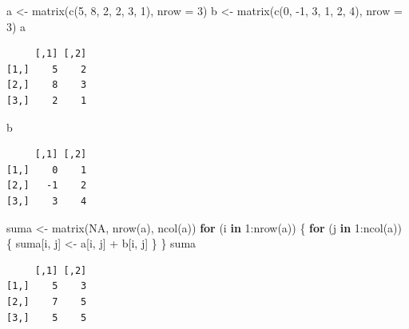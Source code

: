 \documentclass[
]{book}
\newenvironment{Shaded}{\begin{snugshade}}{\end{snugshade}}
\newcommand{\AttributeTok}[1]{\textcolor[rgb]{0.77,0.63,0.00}{#1}}
\newcommand{\ConstantTok}[1]{\textcolor[rgb]{0.00,0.00,0.00}{#1}}
\newcommand{\ControlFlowTok}[1]{\textcolor[rgb]{0.13,0.29,0.53}{\textbf{#1}}}
\newcommand{\DecValTok}[1]{\textcolor[rgb]{0.00,0.00,0.81}{#1}}
\newcommand{\FunctionTok}[1]{\textcolor[rgb]{0.00,0.00,0.00}{#1}}
\newcommand{\NormalTok}[1]{#1}
\newcommand{\OtherTok}[1]{\textcolor[rgb]{0.56,0.35,0.01}{#1}}
\newcommand{\SpecialCharTok}[1]{\textcolor[rgb]{0.00,0.00,0.00}{#1}}
\begin{document}
\begin{Shaded}
\begin{Highlighting}[]
\NormalTok{a }\OtherTok{\textless{}{-}} \FunctionTok{matrix}\NormalTok{(}\FunctionTok{c}\NormalTok{(}\DecValTok{5}\NormalTok{, }\DecValTok{8}\NormalTok{, }\DecValTok{2}\NormalTok{, }\DecValTok{2}\NormalTok{, }\DecValTok{3}\NormalTok{, }\DecValTok{1}\NormalTok{), }\AttributeTok{nrow =} \DecValTok{3}\NormalTok{)}
\NormalTok{b }\OtherTok{\textless{}{-}} \FunctionTok{matrix}\NormalTok{(}\FunctionTok{c}\NormalTok{(}\DecValTok{0}\NormalTok{, }\SpecialCharTok{{-}}\DecValTok{1}\NormalTok{, }\DecValTok{3}\NormalTok{, }\DecValTok{1}\NormalTok{, }\DecValTok{2}\NormalTok{, }\DecValTok{4}\NormalTok{), }\AttributeTok{nrow =} \DecValTok{3}\NormalTok{)}
\NormalTok{a}
\end{Highlighting}
\end{Shaded}

\begin{verbatim}
     [,1] [,2]
[1,]    5    2
[2,]    8    3
[3,]    2    1
\end{verbatim}

\begin{Shaded}
\begin{Highlighting}[]
\NormalTok{b}
\end{Highlighting}
\end{Shaded}

\begin{verbatim}
     [,1] [,2]
[1,]    0    1
[2,]   -1    2
[3,]    3    4
\end{verbatim}

\begin{Shaded}
\begin{Highlighting}[]
\NormalTok{suma }\OtherTok{\textless{}{-}} \FunctionTok{matrix}\NormalTok{(}\ConstantTok{NA}\NormalTok{, }\FunctionTok{nrow}\NormalTok{(a), }\FunctionTok{ncol}\NormalTok{(a))}
\ControlFlowTok{for}\NormalTok{ (i }\ControlFlowTok{in} \DecValTok{1}\SpecialCharTok{:}\FunctionTok{nrow}\NormalTok{(a)) \{}
    \ControlFlowTok{for}\NormalTok{ (j }\ControlFlowTok{in} \DecValTok{1}\SpecialCharTok{:}\FunctionTok{ncol}\NormalTok{(a)) \{}
\NormalTok{        suma[i, j] }\OtherTok{\textless{}{-}}\NormalTok{ a[i, j] }\SpecialCharTok{+}\NormalTok{ b[i, j]}
\NormalTok{    \}}
\NormalTok{\}}
\NormalTok{suma}
\end{Highlighting}
\end{Shaded}

\begin{verbatim}
     [,1] [,2]
[1,]    5    3
[2,]    7    5
[3,]    5    5
\end{verbatim}
\end{document}
